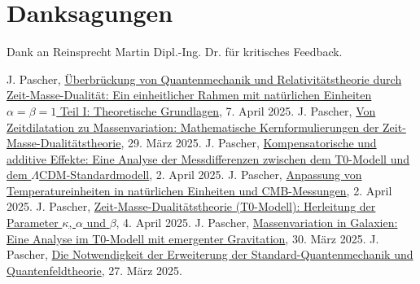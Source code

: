 \documentclass[12pt,a4paper]{article}
\newenvironment{acknowledgments}
{\section*{Danksagungen}}
{\vspace{1em}}
\begin{document}
	\begin{acknowledgments}
		Dank an Reinsprecht Martin Dipl.-Ing. Dr. für kritisches Feedback.
	\end{acknowledgments}
	
	
	\begin{thebibliography}{99}
		 J. Pascher, \href{https://github.com/jpascher/T0-Time-Mass-Duality/tree/main/2/pdf/Deutsch/Bridging Quantum Mechanics and Relativity through Time-Mass Duality Part I Theoretical Foundations.pdf}{Überbrückung von Quantenmechanik und Relativitätstheorie durch Zeit-Masse-Dualität: Ein einheitlicher Rahmen mit natürlichen Einheiten \(\alpha = \beta = 1\) Teil I: Theoretische Grundlagen}, 7. April 2025.
		 J. Pascher, \href{https://github.com/jpascher/T0-Time-Mass-Duality/tree/main/2/pdf/Deutsch/Mathematische Formulierungen der Zeit-Masse-Dualit\%C3\%A4tstheorie mit Lagrange.pdf}{Von Zeitdilatation zu Massenvariation: Mathematische Kernformulierungen der Zeit-Masse-Dualitätstheorie}, 29. März 2025.
		 J. Pascher, \href{https://github.com/jpascher/T0-Time-Mass-Duality/tree/main/2/pdf/Deutsch/Analyse der Messdifferenzen zwischen dem T0-Modell und dem Standardmodell.pdf}{Kompensatorische und additive Effekte: Eine Analyse der Messdifferenzen zwischen dem T0-Modell und dem \(\Lambda\)CDM-Standardmodell}, 2. April 2025.
		 J. Pascher, \href{https://github.com/jpascher/T0-Time-Mass-Duality/tree/main/2/pdf/Deutsch/Anpassung von Temperatureinheiten in nat%C3%BCrlichen Einheiten und CMB-Messungen.pdf}{Anpassung von Temperatureinheiten in natürlichen Einheiten und CMB-Messungen}, 2. April 2025.
		 J. Pascher, \href{https://github.com/jpascher/T0-Time-Mass-Duality/tree/main/2/pdf/Deutsch/Zeit-Masse-Dualit\%C3\%A4tstheorie (T0-Modell) Herleitung der Parameter kappa, alpha und beta.pdf}{Zeit-Masse-Dualitätstheorie (T0-Modell): Herleitung der Parameter \(\kappa\), \(\alpha\) und \(\beta\)}, 4. April 2025.
		 J. Pascher, \href{https://github.com/jpascher/T0-Time-Mass-Duality/tree/main/2/pdf/Deutsch/Massenvariation in Galaxien.pdf}{Massenvariation in Galaxien: Eine Analyse im T0-Modell mit emergenter Gravitation}, 30. März 2025.
		 J. Pascher, \href{https://github.com/jpascher/T0-Time-Mass-Duality/tree/main/2/pdf/Deutsch/Die Notwendigkeit einer Erweiterung der Standard-Quantenmechanik und Quantenfeldtheorie.pdf}{Die Notwendigkeit der Erweiterung der Standard-Quantenmechanik und Quantenfeldtheorie}, 27. März 2025.

\end{thebibliography}
\end{document}

